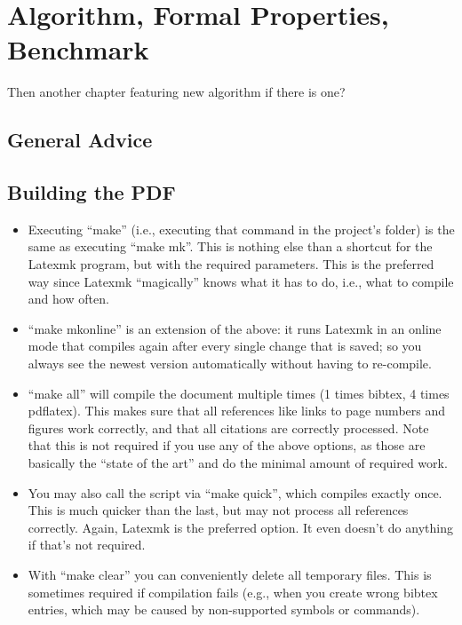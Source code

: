 \chapter{Algorithm, Formal Properties, Benchmark}\label{chap:content}
Then another chapter featuring new algorithm if there is one?
 

\section{General Advice}

\pagebreak %
\section{Building the PDF}

\begin{itemize} 
    \item Executing ``make'' (i.e., executing that command in the project's folder) is the same as executing ``make mk''. This is nothing else than a shortcut for the Latexmk program, but with the required parameters. This is the preferred way since Latexmk ``magically'' knows what it has to do, i.e., what to compile and how often.
    \item ``make mkonline'' is an extension of the above: it runs Latexmk in an online mode that compiles again after every single change that is saved; so you always see the newest version automatically without having to re-compile.
    \item ``make all'' will compile the document multiple times (1 times bibtex, 4 times pdflatex). This makes sure that all references like links to page numbers and figures work correctly, and that all citations are correctly processed. Note that this is not required if you use any of the above options, as those are basically the ``state of the art'' and do the minimal amount of required work.
    \item You may also call the script via ``make quick'', which compiles exactly once. This is much quicker than the last, but may not process all references correctly. Again, Latexmk is the preferred option. It even doesn't do anything if that's not required.
    \item With ``make clear'' you can conveniently delete all temporary files. This is sometimes required if compilation fails (e.g., when you create wrong bibtex entries, which may be caused by non-supported symbols or commands).
    
\end{itemize}




